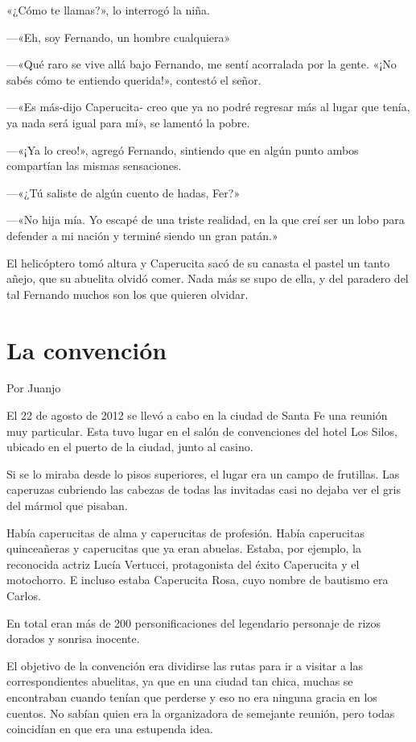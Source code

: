 \documentclass[11pt,twoside,openright,a5paper]{book}
\begin{document}
«¿Cómo te llamas?», lo interrogó la niña.

---«Eh, soy Fernando, un hombre cualquiera»

---«Qué raro se vive allá bajo Fernando, me sentí acorralada por la gente. «¡No sabés cómo  te entiendo querida!», contestó el señor.

---«Es más-dijo Caperucita- creo que ya no podré regresar más al lugar que tenía, ya nada será igual para mí», se lamentó la pobre.

---«¡Ya lo creo!», agregó Fernando, sintiendo que en algún punto ambos compartían las mismas sensaciones.

---«¿Tú saliste de algún cuento de hadas, Fer?»

---«No hija mía. Yo escapé de una triste realidad, en la que creí ser un lobo para defender a mi nación y terminé siendo un gran patán.»

El helicóptero tomó altura y Caperucita sacó de su canasta el pastel un tanto añejo, que su abuelita olvidó comer. Nada más se supo de ella, y del paradero del tal Fernando muchos son los que quieren olvidar.

\section*{La convención}

\begin{flushright}Por Juanjo\end{flushright}

El 22 de agosto de 2012 se llevó a cabo en la ciudad de Santa Fe una reunión muy particular. Esta tuvo lugar en el salón de convenciones del hotel Los Silos, ubicado en el puerto de la ciudad, junto al casino.

Si se lo miraba desde lo pisos superiores, el lugar era un campo de frutillas. Las caperuzas cubriendo las cabezas de todas las invitadas casi no dejaba ver el gris del mármol que pisaban.

Había caperucitas de alma y caperucitas de profesión. Había caperucitas quinceañeras y caperucitas que ya eran abuelas.
Estaba, por ejemplo, la reconocida actriz Lucía Vertucci, protagonista del éxito Caperucita y el motochorro. E incluso estaba Caperucita Rosa, cuyo nombre de bautismo era Carlos.

En total eran más de 200 personificaciones del legendario personaje de rizos dorados y sonrisa inocente.

El objetivo de la convención era dividirse las rutas para ir a visitar a las correspondientes abuelitas, ya que en una ciudad tan chica, muchas se encontraban cuando tenían que perderse y eso no era ninguna gracia en los cuentos. No sabían quien era la organizadora de semejante reunión, pero todas coincidían en que era una estupenda idea.
\end{document}
